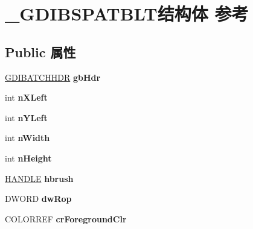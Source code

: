\hypertarget{struct___g_d_i_b_s_p_a_t_b_l_t}{}\section{\+\_\+\+G\+D\+I\+B\+S\+P\+A\+T\+B\+L\+T结构体 参考}
\label{struct___g_d_i_b_s_p_a_t_b_l_t}
\subsection*{Public 属性}
\begin{DoxyCompactItemize}
\item 
\mbox{\label{struct___g_d_i_b_s_p_a_t_b_l_t_a64b437e5031c61929eb653c881cc4c1a}} 
\hyperlink{struct___g_d_i_b_a_t_c_h_h_d_r}{G\+D\+I\+B\+A\+T\+C\+H\+H\+DR} {\bfseries gb\+Hdr}
\item 
\mbox{\label{struct___g_d_i_b_s_p_a_t_b_l_t_aae61543535b1d9a09f868ddf4f4592a2}} 
int {\bfseries n\+X\+Left}
\item 
\mbox{\label{struct___g_d_i_b_s_p_a_t_b_l_t_ae1c90690a79ecb071875a396fb9756a8}} 
int {\bfseries n\+Y\+Left}
\item 
\mbox{\label{struct___g_d_i_b_s_p_a_t_b_l_t_af783fefdf643433c19bd46c89046294d}} 
int {\bfseries n\+Width}
\item 
\mbox{\label{struct___g_d_i_b_s_p_a_t_b_l_t_a39047b8d9059242889927d68d100d543}} 
int {\bfseries n\+Height}
\item 
\mbox{\label{struct___g_d_i_b_s_p_a_t_b_l_t_ab74156a60687249f3fe001215d65a7b9}} 
\hyperlink{interfacevoid}{H\+A\+N\+D\+LE} {\bfseries hbrush}
\item 
\mbox{\label{struct___g_d_i_b_s_p_a_t_b_l_t_a95347ca9e82de2a6e652483abaae5a59}} 
D\+W\+O\+RD {\bfseries dw\+Rop}
\item 
\mbox{\label{struct___g_d_i_b_s_p_a_t_b_l_t_a81f117b54c3d4a7a1ff9629adbcab028}} 
C\+O\+L\+O\+R\+R\+EF {\bfseries cr\+Foreground\+Clr}

\end{DoxyCompactItemize}
